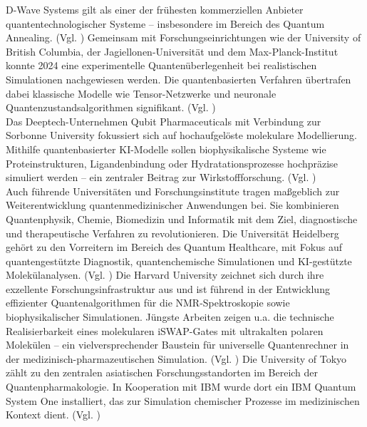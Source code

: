 D-Wave Systems gilt als einer der frühesten kommerziellen Anbieter quantentechnologischer Systeme – insbesondere im Bereich des Quantum Annealing. (Vgl. \cite{flahertyDWaveLooksLarge2024}) Gemeinsam mit Forschungseinrichtungen wie der University of British Columbia, der Jagiellonen-Universität und dem Max-Planck-Institut konnte 2024 eine experimentelle Quantenüberlegenheit bei realistischen Simulationen nachgewiesen werden. Die quantenbasierten Verfahren übertrafen dabei klassische Modelle wie Tensor-Netzwerke und neuronale Quantenzustandsalgorithmen signifikant. (Vgl. \cite{kingComputationalSupremacyQuantum2024})\\

Das Deeptech-Unternehmen Qubit Pharmaceuticals mit Verbindung zur Sorbonne University fokussiert sich auf hochaufgelöste molekulare Modellierung. Mithilfe quantenbasierter KI-Modelle sollen biophysikalische Systeme wie Proteinstrukturen, Ligandenbindung oder Hydratationsprozesse hochpräzise simuliert werden – ein zentraler Beitrag zur Wirkstoffforschung. (Vgl. \cite{gouraud_velocity_2025})\\

Auch führende Universitäten und Forschungsinstitute tragen maßgeblich zur Weiterentwicklung quantenmedizinischer Anwendungen bei. Sie kombinieren Quantenphysik, Chemie, Biomedizin und Informatik mit dem Ziel, diagnostische und therapeutische Verfahren zu revolutionieren. Die Universität Heidelberg gehört zu den Vorreitern im Bereich des Quantum Healthcare, mit Fokus auf quantengestützte Diagnostik, quantenchemische Simulationen und KI-gestützte Molekülanalysen. (Vgl. \cite{noauthor_hgsfp_nodate}) Die Harvard University zeichnet sich durch ihre exzellente Forschungsinfrastruktur aus und ist führend in der Entwicklung effizienter Quantenalgorithmen für die NMR-Spektroskopie sowie biophysikalischer Simulationen. Jüngste Arbeiten zeigen u.a. die technische Realisierbarkeit eines molekularen iSWAP-Gates mit ultrakalten polaren Molekülen – ein vielversprechender Baustein für universelle Quantenrechner in der medizinisch-pharmazeutischen Simulation. (Vgl. \cite{siliezar_harvard_2020, picard_entanglement_2025}) Die University of Tokyo zählt zu den zentralen asiatischen Forschungsstandorten im Bereich der Quantenpharmakologie. In Kooperation mit IBM wurde dort ein IBM Quantum System One installiert, das zur Simulation chemischer Prozesse im medizinischen Kontext dient. (Vgl. \cite{noauthor_utokyo_nodate})\\

